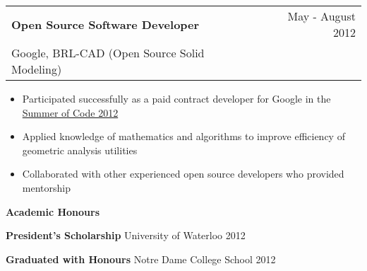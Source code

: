 \documentclass[10pt]{article}
\makeatletter
\newcommand{\resheading}[1]{{\large \colorbox{headercol}{\begin{minipage}{\textwidth}{\textbf{#1 \vphantom{p\^{E}}}}\end{minipage}}}}
\newcommand{\ressubheading}[3]{\item
\begin{tabular*}{7in}{l@{\extracolsep{\fill}}r}
    \textbf{#1} & #2 \\ #3
\end{tabular*}\vspace{-4pt}}
\newcommand{\resitem}[2]{\item{\textbf{#1} #2}}
\makeatother
\begin{document}
\begin{description}
    \ressubheading{Open Source Software Developer} {May - August 2012} {Google, BRL-CAD (Open Source Solid Modeling)}
    \begin{itemize}
        \item{Participated successfully as a paid contract developer for Google in the \href{https://google-melange.appspot.com/gsoc/homepage/google/gsoc2012}{Summer of Code 2012}}
        \item{Applied knowledge of mathematics and algorithms to improve efficiency of geometric analysis utilities}
        \item{Collaborated with other experienced open source developers who provided mentorship}
    \end{itemize}
\end{description}

\resheading{Academic Honours}
\begin{description}
    \resitem{President's Scholarship} {University of Waterloo \hfill 2012}
    \resitem{Graduated with Honours} {Notre Dame College School \hfill 2012}
\end{description}
\end{document}
